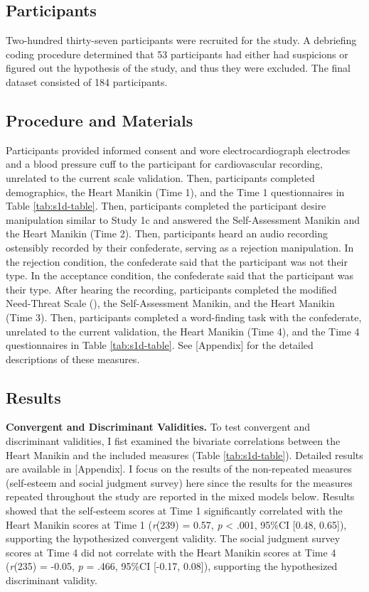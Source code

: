 \documentclass[
]{udthesis}
\begin{document}
\subsection{Participants}\label{participants-3}

Two-hundred thirty-seven participants were recruited for the study. A
debriefing coding procedure determined that 53 participants had either
had suspicions or figured out the hypothesis of the study, and thus they
were excluded. The final dataset consisted of 184 participants.

\subsection{Procedure and Materials}\label{procedure-and-materials-3}

Participants provided informed consent and wore electrocardiograph
electrodes and a blood pressure cuff to the participant for
cardiovascular recording, unrelated to the current scale validation.
Then, participants completed demographics, the Heart Manikin (Time 1),
and the Time 1 questionnaires in Table \ref{tab:s1d-table}. Then,
participants completed the participant desire manipulation similar to
Study 1c and answered the Self-Assessment Manikin and the Heart Manikin
(Time 2). Then, participants heard an audio recording ostensibly
recorded by their confederate, serving as a rejection manipulation. In
the rejection condition, the confederate said that the participant was
not their type. In the acceptance condition, the confederate said that
the participant was their type. After hearing the recording,
participants completed the modified Need-Threat Scale (),
the Self-Assessment Manikin, and the Heart Manikin (Time 3). Then,
participants completed a word-finding task with the confederate,
unrelated to the current validation, the Heart Manikin (Time 4), and the
Time 4 questionnaires in Table \ref{tab:s1d-table}. See
{[}Appendix{]} for the detailed descriptions of these measures.

\subsection{Results}\label{results-3}

\textbf{Convergent and Discriminant Validities.} To test convergent and
discriminant validities, I fist examined the bivariate correlations
between the Heart Manikin and the included measures (Table
\ref{tab:s1d-table}). Detailed results are available in
{[}Appendix{]}. I focus on the results of the non-repeated
measures (self-esteem and social judgment survey) here since the results
for the measures repeated throughout the study are reported in the mixed
models below. Results showed that the self-esteem scores at Time 1
significantly correlated with the Heart Manikin scores at Time 1
(\emph{r}(239) = 0.57, \emph{p} \textless{} .001, 95\%CI {[}0.48, 0.65{]}), supporting the hypothesized
convergent validity. The social judgment survey scores at Time 4 did not
correlate with the Heart Manikin scores at Time 4
(\emph{r}(235) = -0.05, \emph{p} = .466, 95\%CI {[}-0.17, 0.08{]}), supporting the
hypothesized discriminant validity.
\end{document}
